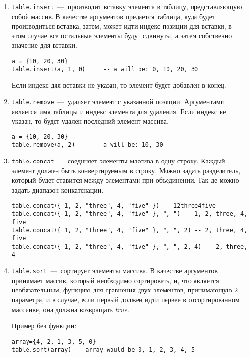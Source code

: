 \begin{enumerate}
	\item \lstinline{table.insert}~---~производит вставку элемента в таблицу, представляющую собой массив. В качестве аргументов предается таблица, куда будет производиться вставка, затем, может идти индекс позиции для вставки, в этом случае все остальные элементы будут сдвинуты, а затем собственно значение для вставки. 
	
\begin{lstlisting}
a = {10, 20, 30}
table.insert(a, 1, 0)     -- a will be: 0, 10, 20, 30
\end{lstlisting}

	Если индекс для вставки не указан, то элемент будет добавлен в конец.
	
	\item \lstinline{table.remove}~---~удаляет элемент с указанной позиции. Аргументами является имя таблицы и индекс элемента для удаления. Если индекс не указан, то будет удален последний элемент массива. 

\begin{lstlisting}
a = {10, 20, 30}
table.remove(a, 2)     -- a will be: 10, 30
\end{lstlisting}

	\item \lstinline{table.concat}~---~соединяет элементы массива в одну строку. Каждый элемент должен быть конвертируемым в строку.  Можно задать разделитель, который будет ставится между элементами при объединении. Так де можно задать диапазон конкатенации.
	 
\begin{lstlisting}
table.concat({ 1, 2, "three", 4, "five" }) -- 12three4five
table.concat({ 1, 2, "three", 4, "five" }, ", ") -- 1, 2, three, 4, five
table.concat({ 1, 2, "three", 4, "five" }, ", ", 2) -- 2, three, 4, five
table.concat({ 1, 2, "three", 4, "five" }, ", ", 2, 4) -- 2, three, 4
\end{lstlisting}

	\item \lstinline{table.sort}~---~сортирует элементы массива. В качестве аргументов принимает массив, который необходимо сортировать, и, что является необязательным, функцию для сравнения двух элементов, принимающую 2 параметра, и в случае, если первый должен идти первее в отсортированном массииве, она должна возвращать \emph{true}. 

Пример без функции:	
\begin{lstlisting}
array={4, 2, 1, 3, 5, 0}
table.sort(array) -- array would be 0, 1, 2, 3, 4, 5
\end{lstlisting}


\end{enumerate}
